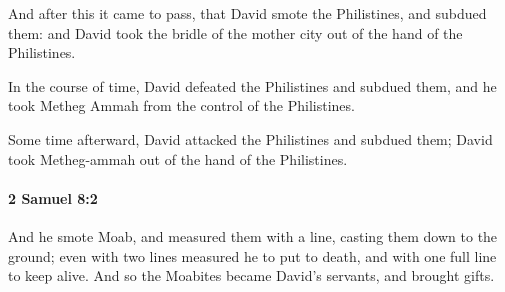 			\begin{versebox}
					\item[BHS] 
					\item[ASV] And after this it came to pass, that David smote the Philistines, and subdued them: and David took the bridle of the mother city out of the hand of the Philistines.
					\item[NIV] In the course of time, David defeated the Philistines and subdued them, and he took Metheg Ammah from the control of the Philistines.
					\item[NRSV] Some time afterward, David attacked the Philistines and subdued them; David took Metheg-ammah out of the hand of the Philistines.
			\end{versebox}

		\paragraph{2 Samuel 8:2} %
			\label{2SAMUEL-8-2}

			And he smote Moab, and measured them with a line, casting them down to the ground; even with two lines measured he to put to death, and with one full line to keep alive. And so the Moabites became David’s servants, and brought gifts.

